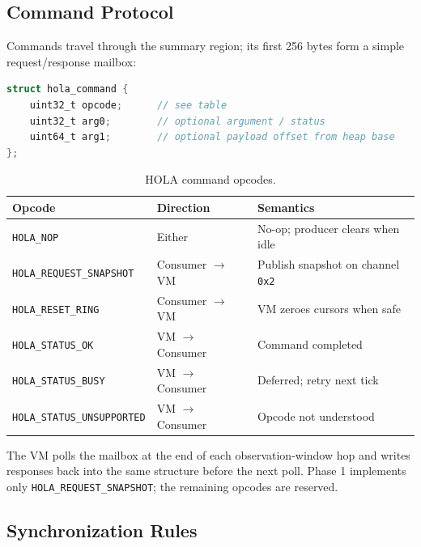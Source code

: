 \subsection{Command Protocol}

Commands travel through the summary region; its first 256 bytes form a simple
request/response mailbox:

\begin{lstlisting}[language=C]
struct hola_command {
    uint32_t opcode;      // see table
    uint32_t arg0;        // optional argument / status
    uint64_t arg1;        // optional payload offset from heap base
};
\end{lstlisting}

\begin{table}[h]
\centering
\begin{tabular}{lll}
\toprule
Opcode & Direction & Semantics \\
\midrule
\texttt{HOLA\_NOP} & Either & No-op; producer clears when idle \\
\texttt{HOLA\_REQUEST\_SNAPSHOT} & Consumer $\rightarrow$ VM & Publish snapshot on channel \texttt{0x2} \\
\texttt{HOLA\_RESET\_RING} & Consumer $\rightarrow$ VM & VM zeroes cursors when safe \\
\texttt{HOLA\_STATUS\_OK} & VM $\rightarrow$ Consumer & Command completed \\
\texttt{HOLA\_STATUS\_BUSY} & VM $\rightarrow$ Consumer & Deferred; retry next tick \\
\texttt{HOLA\_STATUS\_UNSUPPORTED} & VM $\rightarrow$ Consumer & Opcode not understood \\
\bottomrule
\end{tabular}
\caption{HOLA command opcodes.}
\end{table}

The VM polls the mailbox at the end of each observation-window hop and writes
responses back into the same structure before the next poll. Phase 1 implements
only \texttt{HOLA\_REQUEST\_SNAPSHOT}; the remaining opcodes are reserved.

\subsection{Synchronization Rules}

